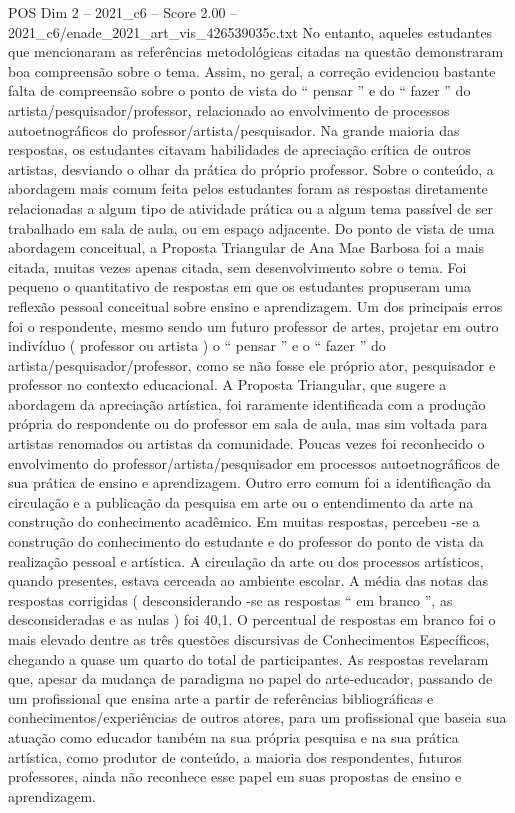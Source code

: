 \begin{textsample}{POS Dim 2 – 2021\_c6 – Score 2.00 – 2021\_c6/enade\_2021\_art\_vis\_426539035c.txt}
No entanto, aqueles estudantes que mencionaram as referências metodológicas citadas na questão demonstraram boa compreensão sobre o tema.
Assim, no geral, a correção evidenciou bastante falta de compreensão sobre o ponto de vista do “ pensar ” e do “ fazer ” do artista/pesquisador/professor, relacionado ao envolvimento de processos autoetnográficos do professor/artista/pesquisador.
Na grande maioria das respostas, os estudantes citavam habilidades de apreciação crítica de outros artistas, desviando o olhar da prática do próprio professor.
Sobre o conteúdo, a abordagem mais comum feita pelos estudantes foram as respostas diretamente relacionadas a algum tipo de atividade prática ou a algum tema passível de ser trabalhado em sala de aula, ou em espaço adjacente.
Do ponto de vista de uma abordagem conceitual, a Proposta Triangular de Ana Mae Barbosa foi a mais citada, muitas vezes apenas citada, sem desenvolvimento sobre o tema.
Foi pequeno o quantitativo de respostas em que os estudantes propuseram uma reflexão pessoal conceitual sobre ensino e aprendizagem.
Um dos principais erros foi o respondente, mesmo sendo um futuro professor de artes, projetar em outro indivíduo ( professor ou artista ) o “ pensar ” e o “ fazer ” do artista/pesquisador/professor, como se não fosse ele próprio ator, pesquisador e professor no contexto educacional.
A Proposta Triangular, que sugere a abordagem da apreciação artística, foi raramente identificada com a produção própria do respondente ou do professor em sala de aula, mas sim voltada para artistas renomados ou artistas da comunidade.
Poucas vezes foi reconhecido o envolvimento do professor/artista/pesquisador em processos autoetnográficos de sua prática de ensino e aprendizagem.
Outro erro comum foi a identificação da circulação e a publicação da pesquisa em arte ou o entendimento da arte na construção do conhecimento acadêmico.
Em muitas respostas, percebeu -se a construção do conhecimento do estudante e do professor do ponto de vista da realização pessoal e artística.
A circulação da arte ou dos processos artísticos, quando presentes, estava cerceada ao ambiente escolar.
A média das notas das respostas corrigidas ( desconsiderando -se as respostas “ em branco ”, as desconsideradas e as nulas ) foi 40,1.
O percentual de respostas em branco foi o mais elevado dentre as três questões discursivas de Conhecimentos Específicos, chegando a quase um quarto do total de participantes.
As respostas revelaram que, apesar da mudança de paradigma no papel do arte-educador, passando de um profissional que ensina arte a partir de referências bibliográficas e conhecimentos/experiências de outros atores, para um profissional que baseia sua atuação como educador também na sua própria pesquisa e na sua prática artística, como produtor de conteúdo, a maioria dos respondentes, futuros professores, ainda não reconhece esse papel em suas propostas de ensino e aprendizagem.

\end{textsample}
